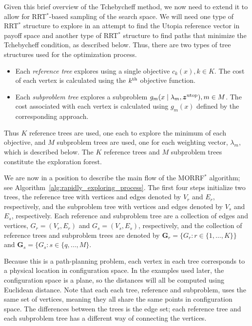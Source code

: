\documentclass{article}
\begin{document}
Given this brief overview of the Tchebycheff method, we now need to extend it to allow for RRT$^{*}$-based sampling of the search space.  
We will need one type of RRT$^{*}$ structure to explore in an attempt to find the Utopia reference vector in payoff space and another type of RRT$^{*}$ structure to find paths that minimize the Tchebycheff condition, as described below.  
Thus, there are two types of tree structures used for the optimization process.
\begin{itemize}
\item Each \emph{reference tree} explores using a single objective $ c_{k} (x), k \in K $. 
The cost of each vertex is calculated using the $ k^{\rm th} $ objective function.
\item Each \emph{subproblem tree} explores a subproblem $ g_{m} ( x \mid \lambda_{m} , \bm{z}^{\rm utop} ) , m \in M $.
The cost associated with each vertex is calculated using $ g_{m}(x) $ defined by the corresponding approach.
\end{itemize}
Thus $ K $ reference trees are used, one each to explore the minimum of each objective, and $ M $ subproblem trees are used, one for each weighting vector, $ \lambda_{m} $, which is described below.  
The $K$ reference trees and $M$ subproblem trees constitute the exploration forest.

We are now in a position to describe the main flow of the MORRF$^{*}$ algorithm; see Algorithm~\ref{alg:rapidly_exploring_process}.  
The first four steps initialize two trees, the reference tree with vertices and edges denoted by $V_r$ and $E_r$, respectively, and the subproblem tree with vertices and edges denoted by $V_s$ and $E_s$, respectively.  
Each reference and subproblem tree are a collection of edges and vertices, $G_r=(V_r,E_r)$ and $G_s=(V_s,E_s)$, respectively, and the collection of reference trees and subproblem trees are denoted by ${\mathbf G}_r = \{G_r: r\in \{1, \ldots, K\}\}$ and ${\mathbf G}_s = \{G_s: s \in \{q, \ldots, M\}$.  

Because this is a path-planning problem, each vertex in each tree corresponds to a physical location in configuration space.  
In the examples used later, the configuration space is a plane, so the distances will all be computed using Euclidean distance. 
Note that each each tree, reference and subproblem, uses the same set of vertices, meaning they all share the same points in configuration space.  
The differences between the trees is the edge set; each reference tree and each subproblem tree has a different way of connecting the vertices.
\end{document}
